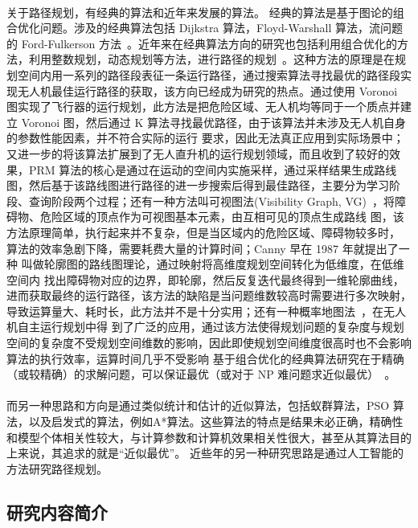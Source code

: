 \documentclass[UTF8,a4paper]{ctexart}
\begin{document}
\paragraph{}关于路径规划，有经典的算法和近年来发展的算法。 经典的算法是基于图论的组合优化问题。涉及的经典算法包括 Dijkstra 算法，Floyd-Warshall 算法，流问题的 Ford-Fulkerson 方法~\cite{introtoalgo}。近年来在经典算法方向的研究也包括利用组合优化的方法，利用整数规划，动态规划等方法，进行路径的规划~\cite{introtoor}。这种方法的原理是在规划空间内用一系列的路径段表征一条运行路径，通过搜索算法寻找最优的路径段实现无人机最佳运行路径的获取，该方向已经成为研究的热点。通过使用 Voronoi 图实现了飞行器的运行规划，此方法是把危险区域、无人机均等同于一个质点并建立 Voronoi 图，然后通过 K 算法寻找最优路径，由于该算法并未涉及无人机自身的参数性能因素，并不符合实际的运行 要求，因此无法真正应用到实际场景中；又进一步的将该算法扩展到了无人直升机的运行规划领域，而且收到了较好的效果，PRM 算法的核心是通过在运动的空间内实施采样，通过采样结果生成路线图，然后基于该路线图进行路径的进一步搜索后得到最佳路径，主要分为学习阶段、查询阶段两个过程；还有一种方法叫可视图法(Visibility Graph, VG)~\cite{2005coordination}，将障碍物、危险区域的顶点作为可视图基本元素，由互相可见的顶点生成路线 图，该方法原理简单，执行起来并不复杂，但是当区域内的危险区域、障碍物较多时， 算法的效率急剧下降，需要耗费大量的计算时间；Canny 早在 1987 年就提出了一种 叫做轮廓图的路线图理论，通过映射将高维度规划空间转化为低维度，在低维空间内 找出障碍物对应的边界，即轮廓，然后反复迭代最终得到一维轮廓曲线，进而获取最终的运行路径，该方法的缺陷是当问题维数较高时需要进行多次映射，导致运算量大、耗时长，此方法并不是十分实用；还有一种概率地图法~\cite{zhangyi2007j}，在无人机自主运行规划中得 到了广泛的应用，通过该方法使得规划问题的复杂度与规划空间的复杂度不受规划空间维数的影响，因此即使规划空间维度很高时也不会影响算法的执行效率，运算时间几乎不受影响 基于组合优化的经典算法研究在于精确（或较精确）的求解问题，可以保证最优（或对于 NP 难问题求近似最优）~\cite{chenyan2009}。
\paragraph{}而另一种思路和方向是通过类似统计和估计的近似算法，包括蚁群算法，PSO 算法，以及启发式的算法，例如A*算法。这些算法的特点是结果未必正确，精确性和模型个体相关性较大，与计算参数和计算机效果相关性很大，甚至从其算法目的上来说，其追求的就是“近似最优”。 近些年的另一种研究思路是通过人工智能的方法研究路径规划。

\subsection{研究内容简介}
\end{document}
